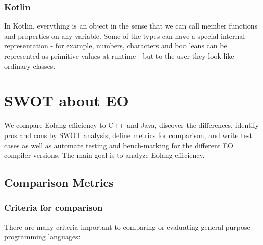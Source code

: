 \documentclass[12pt]{book}
\begin{document}
\subsection{Kotlin}
In Kotlin, everything is an object in the sense that we can call member functions and properties on any variable. 
Some of the types can have a special internal representation - for example, 
numbers, characters and boo leans can be represented 
as primitive values at runtime - but to the user they look like ordinary classes.

\chapter{SWOT about EO}
We compare Eolang efficiency to C++ and Java, discover the differences, identify pros and cons by SWOT analysis, define metrics for comparison, and write test cases as well as automate testing and bench-marking for the different EO compiler versions. The main goal is to analyze Eolang efficiency.

\section{Comparison Metrics}
\subsection{Criteria for comparison}
There are many criteria important to comparing or evaluating general purpose programming languages:
\end{document}
